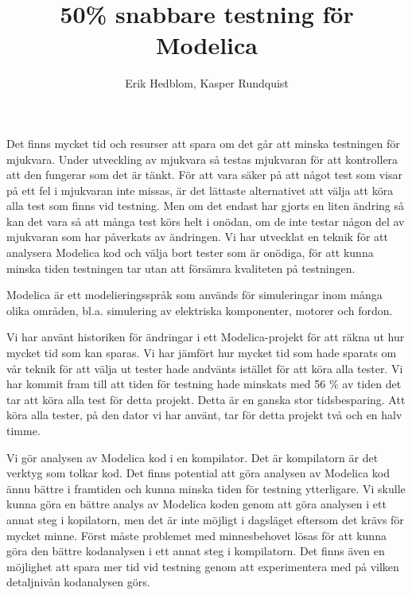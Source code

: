 \documentclass{popsci}
\author{Erik Hedblom, Kasper Rundquist}
\title{50\% snabbare testning för Modelica}
\begin{document}


{\noindent Det finns mycket tid och resurser att spara om det går att minska testningen för mjukvara. Under utveckling av mjukvara så testas mjukvaran för att kontrollera att den fungerar som det är tänkt. För att vara säker på att något test som visar på ett fel i mjukvaran inte missas, är det lättaste alternativet att välja att köra alla test som finns vid testning. Men om det endast har gjorts en liten ändring så kan det vara så att många test körs helt i onödan, om de inte testar någon del av mjukvaran som har påverkats av ändringen. Vi har utvecklat en teknik för att analysera Modelica kod och välja bort tester som är onödiga, för att kunna minska tiden testningen tar utan att försämra kvaliteten på testningen.

Modelica är ett modelieringsspråk som används för simuleringar inom många olika områden, bl.a. simulering av elektriska komponenter, motorer och fordon.

Vi har använt historiken för ändringar i ett Modelica-projekt för att räkna ut hur mycket tid som kan sparas. Vi har jämfört hur mycket tid som hade sparats om vår teknik för att välja ut tester hade andvänts istället för att köra alla tester. Vi har kommit fram till att tiden för testning hade minskats med 56 \% av tiden det tar att köra alla test för detta projekt. Detta är en ganska stor tidsbesparing. Att köra alla tester, på den dator vi har använt, tar för detta projekt två och en halv timme.

Vi gör analysen av Modelica kod i en kompilator. Det är kompilatorn är det verktyg som tolkar kod. Det finns potential att göra analysen av Modelica kod ännu bättre i framtiden och kunna minska tiden för testning ytterligare. Vi skulle kunna göra en bättre analys av Modelica koden genom att göra analysen i ett annat steg i kopilatorn, men det är inte möjligt i dagsläget eftersom det krävs för mycket minne. Först måste problemet med minnesbehovet lösas för att kunna göra den bättre kodanalysen i ett annat steg i kompilatorn. Det finns även en möjlighet att spara mer tid vid testning genom att experimentera med på vilken detaljnivån kodanalysen görs. 
}
\end{document}
